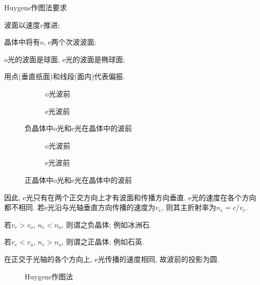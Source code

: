 \documentclass{ctexart}
\begin{document}
Huygens作图法要求
\begin{cenum}
    \item 波面以速度$v$推进;
    \item 晶体中将有o, e两个次波波面;
    \item o光的波面是球面, e光的波面是椭球面;
    \item 用点(垂直纸面)和线段(面内)代表偏振.
\end{cenum}
\begin{figure}[ht]
    \centering
    \begin{subfigure}{4.1cm}
        \centering
        \caption{o光波前} 
    \end{subfigure}
    \begin{subfigure}{6cm}
        \centering
        \caption{e光波前} 
    \end{subfigure}
    \caption{负晶体中o光和e光在晶体中的波前}
\end{figure}
\begin{figure}[ht]
    \centering
    \begin{subfigure}{4.1cm}
        \centering
        \caption{o光波前} 
    \end{subfigure}
    \begin{subfigure}{6cm}
        \centering
        \caption{e光波前} 
    \end{subfigure}
    \caption{正晶体中o光和e光在晶体中的波前}
\end{figure}
因此, e光只有在两个正交方向上才有波面和传播方向垂直. e光的速度在各个方向都不相同. 若e光沿与光轴垂直方向传播的速度为$v_e$, 则其主折射率为$n_e = c/v_e$.
\begin{cenum}
    \item 若$v_e > v_o$, $n_e < n_o$, 则谓之负晶体; 例如冰洲石.
    \item 若$v_e < v_o$, $n_e > n_o$, 则谓之正晶体; 例如石英.
\end{cenum}
在正交于光轴的各个方向上, e光传播的速度相同, 故波前的投影为圆.

\begin{figure}[ht]
    \centering
    \begin{subfigure}{5cm}
        \centering
        \caption{}
        \label{fig:HuygensStep1}
    \end{subfigure}
    \begin{subfigure}{5cm}
        \centering
        \caption{}
        \label{fig:HuygensStep2}
    \end{subfigure}
    \begin{subfigure}{5cm}
        \centering
        \caption{}
        \label{fig:HuygensStep3}
    \end{subfigure}
    \begin{subfigure}{5cm}
        \centering
        \caption{}
        \label{fig:HuygensStep4}
    \end{subfigure}
    \caption{Huygens作图法}
\end{figure}
\end{document}
